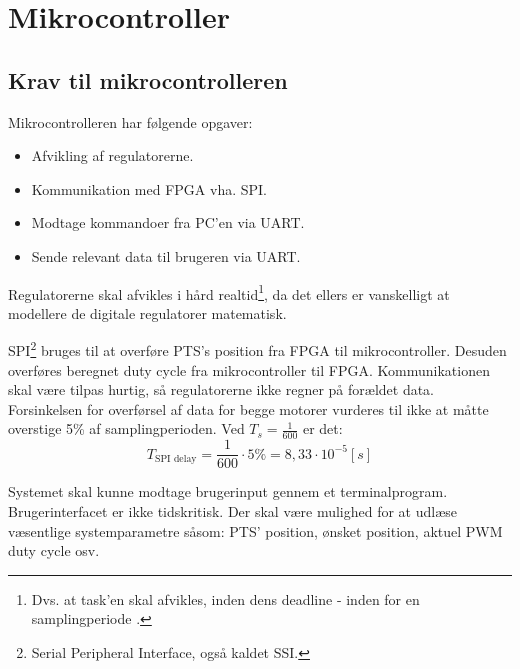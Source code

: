 \section{Mikrocontroller}
\label{sec:mikrocontroller}
%
\subsection{Krav til mikrocontrolleren}
Mikrocontrolleren har følgende opgaver: 

\begin{itemize}
\itemsep1pt
	\item Afvikling af regulatorerne.
	\item Kommunikation med FPGA vha. SPI.
	\item Modtage kommandoer fra PC'en via UART.
	\item Sende relevant data til brugeren via UART.
\end{itemize}

Regulatorerne skal afvikles i hård realtid\footnote{Dvs. at task'en skal afvikles, inden dens deadline - inden for en samplingperiode \citep{operating_systems_concepts_ed8}.},
da det ellers er vanskelligt at modellere de digitale regulatorer matematisk.

SPI\footnote{Serial Peripheral Interface, også kaldet SSI.} bruges til at overføre PTS's position fra FPGA til mikrocontroller.
Desuden overføres beregnet duty cycle fra mikrocontroller til FPGA.
Kommunikationen skal være tilpas hurtig, så regulatorerne ikke regner på forældet data.
Forsinkelsen for overførsel af data for begge motorer vurderes til ikke at måtte overstige 5\% af samplingperioden.
Ved $T_s = \frac{1}{600}$ er det: 
\begin{equation}
	T_{\text{SPI delay}} = \frac{1}{600} \cdot 5 \% = 8,33 \cdot 10^{-5}[s]
	\label{eq:uc:spi-krav}
\end{equation}

Systemet skal kunne modtage brugerinput gennem et terminalprogram.
Brugerinterfacet er ikke tidskritisk.
Der skal være mulighed for at udlæse væsentlige systemparametre såsom:
PTS' position, ønsket position, aktuel PWM duty cycle osv.

